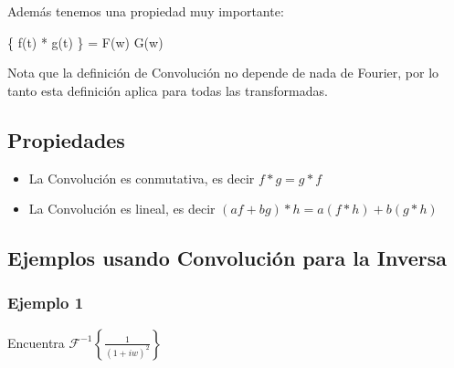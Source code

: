 \documentclass[12pt, fleqn]{report}                             %
\newenvironment{MultiLineEquation*}[1]                          %
        {\begin{equation*}\begin{alignedat}{#1}}                    %
        {\end{alignedat}\end{equation*}}                            %
\newcommand{\FourierT}[1]{\mathscr{F} \left\{ #1 \right\} }     %
\newcommand{\InvFourierT}[1]{\mathscr{F}^{-1}\left\{#1\right\}} %
\begin{document}
            Además tenemos una propiedad muy importante:
            \begin{MultiLineEquation*}{3}
                \FourierT{f(t) \;*\; g(t)} = F(w) \; G(w)
            \end{MultiLineEquation*}

            Nota que la definición de Convolución no depende de nada de Fourier, por lo tanto
            esta definición aplica para todas las transformadas.


                \subsection{Propiedades}

                    \begin{itemize}
                        \item La Convolución es conmutativa, es decir $f * g = g * f$
                        \item La Convolución es lineal, es decir $(af + bg)*h = a(f*h) + b(g*h)$
                    \end{itemize}



                \clearpage
                \subsection{Ejemplos usando Convolución para la Inversa}

                    \subsubsection{Ejemplo 1}

                    Encuentra $\InvFourierT{\frac{1}{(1+iw)^2}}$
\end{document}
